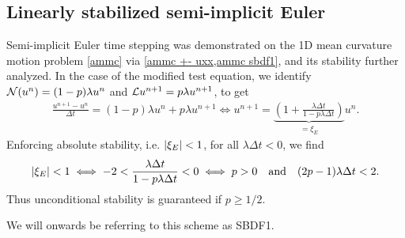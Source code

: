 \subsection{Linearly stabilized semi-implicit Euler}
Semi-implicit Euler time stepping was demonstrated on the 1D mean curvature motion problem \cref{ammc} via \cref{ammc +- uxx,ammc sbdf1}, and its stability further analyzed. In the case of the modified test equation, we identify $\mathcal{N}(u^n) = (1-p)\lambda u^n$ and $\mathcal{L} u^{n+1} = p\lambda u^{n+1}$, to get 
\begin{align}
\frac{u^{n+1} - u^n}{\Delta t} 
= (1-p)\lambda u^n + p\lambda u^{n+1} 
\iff 
u^{n+1} 
= \underbrace{\left(1 + \frac{\lambda \Delta t}{1 - p\lambda\Delta t} \right)}_{=\xi_E} u^n.
\end{align}
Enforcing absolute stability, i.e. $\left|\xi_E\right| < 1$, for all $\lambda\Delta t < 0$, we find 
\begin{align}
\left|\xi_E\right| < 1 \iff 
-2 < \frac{\lambda\Delta t}{1 - p\lambda\Delta t} < 0
\iff p > 0 \quad\text{and}\quad (2p-1)\lambda\Delta t < 2.
\end{align}
Thus unconditional stability is guaranteed if $p \geq 1/2$.

We will onwards be referring to this scheme as SBDF1.

